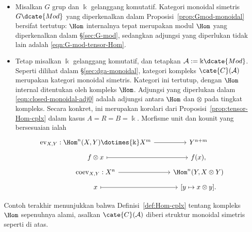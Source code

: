 \begin{itemize}
	\item Misalkan $G$ grup dan $\Bbbk$ gelanggang komutatif. Kategori monoidal
	simetris $G\dcate{Mod}$ yang diperkenalkan dalam
	Proposisi~\ref{prop:Gmod-monoidal} bersifat tertutup: $\Hom$ internalnya
	tepat merupakan modul $\Hom$ yang diperkenalkan dalam
	\S\ref{sec:G-mod}, sedangkan adjungsi yang diperlukan tidak lain adalah
	\eqref{eqn:G-mod-tensor-Hom}.

	\item Tetap misalkan $\Bbbk$ gelanggang komutatif, dan tetapkan
	$\mathcal{A}:=\Bbbk\dcate{Mod}$. Seperti dilihat dalam
	\S\ref{sec:dga-monoidal}, kategori kompleks $\cate{C}(\mathcal{A})$
	merupakan kategori monoidal simetris. Kategori ini tertutup, dengan $\Hom$
	internal ditentukan oleh kompleks $\Hom$. Adjungsi yang diperlukan dalam
	\eqref{eqn:closed-monoidal-adj0} adalah adjungsi antara $\Hom$
	dan $\otimes$ pada tingkat kompleks. Secara konkret, ini merupakan
	korolari dari Proposisi~\ref{prop:tensor-Hom-cplx} dalam kasus
	$A=R=B=\Bbbk$. Morfisme unit dan kounit yang bersesuaian ialah
	\[\begin{tikzcd}[row sep=tiny]
		\mathrm{ev}_{X, Y}: \Hom^n(X, Y) \dotimes{\Bbbk} X^m \arrow[r] & Y^{n+m} \\
		f \otimes x \arrow[mapsto, r] & f(x), \\
		\mathrm{coev}_{X, Y}: X^n \arrow[r] & \Hom^n(Y, X \otimes Y) \\
		x \arrow[mapsto, r] & {[y \mapsto x \otimes y]}.
	\end{tikzcd}\]
\end{itemize}

Contoh terakhir menunjukkan bahwa Definisi~\ref{def:Hom-cplx} tentang kompleks
$\Hom$ sepenuhnya alami, asalkan $\cate{C}(\mathcal{A})$ diberi struktur
monoidal simetris seperti di atas.
